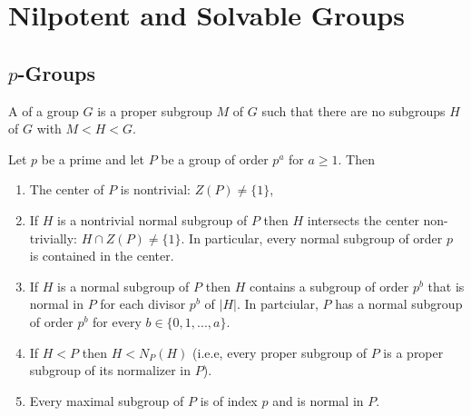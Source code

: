 \documentclass[12pt, a4paper, oneside, openright, titlepage]{book}
\begin{document}
\chapter{\textsection\textsection Nilpotent and Solvable Groups}

\section{\textsection $p$-Groups}

\begin{defn}
    A  of a group $G$ is a proper subgroup $M$ of $G$ such that there are no subgroups $H$ of $G$ with $M < H < G$.
\end{defn}


\begin{thm}
    Let $p$ be a prime and let $P$ be a group of order $p^a$ for $a \geq 1$. Then \begin{enumerate}
        \item The center of $P$ is nontrivial: $Z(P) \neq \{1\}$,
        \item If $H$ is a nontrivial normal subgroup of $P$ then $H$ intersects the center non-trivially: $H \cap Z(P) \neq \{1\}$. In particular, every normal subgroup of order $p$ is contained in the center.
        \item If $H$ is a normal subgroup of $P$ then $H$ contains a subgroup of order $p^b$ that is normal in $P$ for each divisor $p^b$ of $|H|$. In partciular, $P$ has a normal subgroup of order $p^b$ for every $b \in \{0,1,...,a\}$.
        \item If $H < P$ then $H < N_P(H)$ (i.e.e, every proper subgroup of $P$ is a proper subgroup of its normalizer in $P$).
        \item Every maximal subgroup of $P$ is of index $p$ and is normal in $P$.
    \end{enumerate}
\end{thm}
\end{document}
